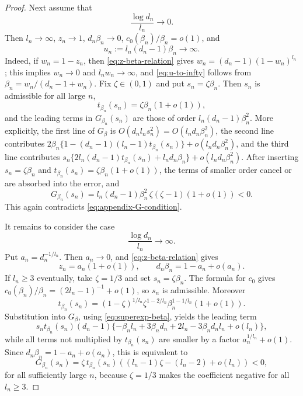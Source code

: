 \documentclass[11pt]{amsart}
\theoremstyle{plain}
\numberwithin{equation}{section}
\numberwithin{theorem}{section}
\numberwithin{figure}{section}
\begin{document}
\begin{proof}
Next assume that
\[
  \frac{\log d_n}{l_n}\longrightarrow0.
\]
Then \(l_n\to\infty\), \(z_n\to1\), \(d_n\beta_n\to0\),
\(c_0(\beta_n)/\beta_n=o(1)\), and
\begin{equation}
  u_n:=l_n(d_n-1)\beta_n\longrightarrow\infty .
\label{eq:u-to-infty}
\end{equation}
Indeed, if \(w_n=1-z_n\), then \eqref{eq:z-beta-relation} gives
\(w_n=(d_n-1)(1-w_n)^{l_n}\); this implies \(w_n\to0\) and
\(l_nw_n\to\infty\), and \eqref{eq:u-to-infty} follows from
\(\beta_n=w_n/(d_n-1+w_n)\).  Fix \(\zeta\in(0,1)\) and put
\(s_n=\zeta\beta_n\).  Then \(s_n\) is admissible for all large \(n\),
\[
  t_{\beta_n}(s_n)=\zeta\beta_n(1+o(1)),
\]
and the leading terms in \(G_{\beta_n}(s_n)\) are those of order
\(l_n(d_n-1)\beta_n^2\).  More explicitly, the first line of \(G_\beta\) is
\(O(d_nl_ns_n^2)=O(l_nd_n\beta_n^2)\), the second line contributes
\(2\beta_n\{1-(d_n-1)(l_n-1)t_{\beta_n}(s_n)\}+o(l_nd_n\beta_n^2)\), and the
third line contributes
\(s_n\{2l_n(d_n-1)t_{\beta_n}(s_n)+l_nd_n\beta_n\}+o(l_nd_n\beta_n^2)\).
After inserting \(s_n=\zeta\beta_n\) and
\(t_{\beta_n}(s_n)=\zeta\beta_n(1+o(1))\), the terms of smaller order cancel or are
absorbed into the error, and
\begin{equation}
  G_{\beta_n}(s_n)
  =l_n(d_n-1)\beta_n^2\,\zeta(\zeta-1)(1+o(1))<0.
\label{eq:G-small-ratio}
\end{equation}
This again contradicts \eqref{eq:appendix-G-condition}.

It remains to consider the case
\[
  \frac{\log d_n}{l_n}\longrightarrow\infty.
\]
Put \(a_n=d_n^{-1/l_n}\).  Then \(a_n\to0\), and
\eqref{eq:z-beta-relation} gives
\begin{equation}
  z_n=a_n(1+o(1)),
  \qquad
  d_n\beta_n=1-a_n+o(a_n).
\label{eq:superexp-beta}
\end{equation}
If \(l_n\ge3\) eventually, take \(\zeta=1/3\) and set \(s_n=\zeta\beta_n\).  The formula
for \(c_0\) gives \(c_0(\beta_n)/\beta_n=(2l_n-1)^{-1}+o(1)\), so \(s_n\) is admissible.
Moreover
\[
  t_{\beta_n}(s_n)
  =(1-\zeta)^{1/l_n}\zeta^{1-2/l_n}\beta_n^{1-1/l_n}(1+o(1)).
\]
Substitution into \(G_\beta\), using \eqref{eq:superexp-beta}, yields the leading
term
\[
  s_n t_{\beta_n}(s_n)(d_n-1)
  \{-\beta_n l_n+3\beta_nd_n+2l_n-3\beta_nd_nl_n+o(l_n)\},
\]
while all terms not multiplied by \(t_{\beta_n}(s_n)\) are smaller by a factor
\(a_n^{1/l_n}+o(1)\).  Since \(d_n\beta_n=1-a_n+o(a_n)\), this is equivalent to
\begin{equation}
  G_{\beta_n}(s_n)
  =\zeta\,t_{\beta_n}(s_n)
    \left((l_n-1)\zeta-(l_n-2)+o(l_n)\right)<0,
\label{eq:G-superexp-lge3}
\end{equation}
for all sufficiently large \(n\), because \(\zeta=1/3\) makes the coefficient negative for
all \(l_n\ge3\).


\end{proof}
\end{document}

